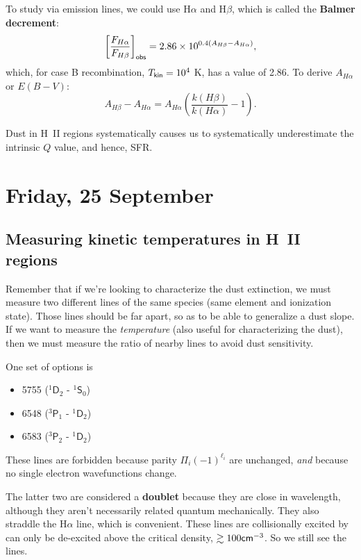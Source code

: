 \documentclass{tufte-handout}
\renewcommand{\textbf}[1]{{\bf \textcolor{dark-gray}{#1}}}
\renewcommand{\rm}{\sf}
\renewcommand{\textrm}{\textsf}
\newcommand{\HII}{\textnormal{H{\smaller~\textsc{II}}}}
\renewcommand{\smallcaps}[1]{{\smaller~\textsc{#1}}}
\newcommand{\spec}[2]{\textnormal{#1}\smallcaps{#2}} %
\newcommand{\term}[4]{$^{#1}\textrm{#2}_{#3}^{\textrm{#4}}$}
\begin{document}
To study via emission lines, we could use H$\alpha$ and H$\beta$, which is called the \textbf{Balmer decrement}:
\begin{equation}
\left [\frac{F_{H\alpha}}{F_{H\beta}}\right ]_{\rm obs} = 2.86 \times 10^{0.4 (A_{H\beta} - A_{H\alpha})},
\end{equation}
which, for case B recombination, $T_{\rm kin } = 10^4$ K, has a value of 2.86. To derive $A_{H\alpha}$ or $E(B-V)$:
\[A_{H \beta} - A_{H\alpha}  = A_{H\alpha}\left (\frac{k(H\beta)}{k(H\alpha)} - 1\right ).\]

Dust in \HII{} regions systematically causes us to systematically underestimate the intrinsic $Q$ value, and hence, SFR.

\section{Friday, 25 September}
\subsection{Measuring kinetic temperatures in \HII{} regions}
Remember that if we're looking to characterize the dust extinction, we must measure two different lines of the same species (same element and ionization state). Those lines should be far apart, so as to be able to generalize a dust slope.
If we want to measure the \textit{temperature} (also useful for characterizing the dust), then we must measure the ratio of nearby lines to avoid dust sensitivity.

One set of options is
\begin{itemize}
\item[] [\spec{N}{II}] 5755 (\term{1}{D}{2}{} - \term{1}{S}{0}{})
\item[] [\spec{N}{II}] 6548 (\term{3}{P}{1}{} - \term{1}{D}{2}{})
\item[] [\spec{N}{II}] 6583 (\term{3}{P}{2}{} - \term{1}{D}{2}{})
\end{itemize}
These lines are forbidden because parity $\Pi_i (-1)^{\ell_i}$ are unchanged, \textit{and} because no single electron wavefunctions change.

The latter two are considered a \textbf{doublet} because they are close in wavelength, although they aren't necessarily related quantum mechanically. They also straddle the H$\alpha$ line, which is convenient. These lines are collisionally excited by can only be de-excited above the critical density, $\gtrsim 100 {\rm cm}^{-3}$. So we still see the lines.
\end{document}
